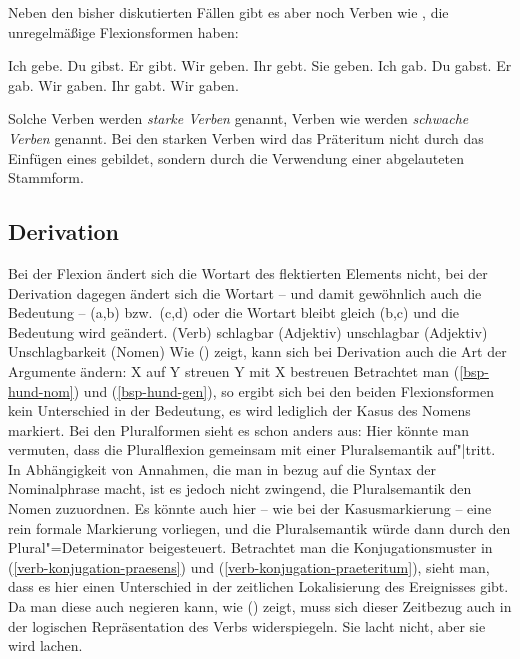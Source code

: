 Neben den bisher diskutierten Fällen gibt es aber noch Verben wie , die unregelmäßige
Flexionsformen haben:
\begin{multicols}{2}
\eal
\ex Ich gebe.   
\ex Du  gibst.  
\ex Er  gibt.   
\ex Wir geben.  
\ex Ihr gebt.   
\ex Sie geben. 
\zl
\eal
\ex Ich gab.
\ex Du  gabst.
\ex Er  gab.
\ex Wir gaben.
\ex Ihr gabt.
\ex Wir gaben. 
\zl
\end{multicols}
\noindent
Solche Verben werden \emph{starke Verben} genannt,
Verben wie  werden \emph{schwache Verben} genannt.
Bei den starken Verben wird das Präteritum nicht durch das Einfügen eines  gebildet,
sondern durch die Verwendung einer abgelauteten Stammform.


\subsection{Derivation}
\label{sec-phen-derivation}

Bei der Flexion ändert sich die Wortart des flektierten Elements nicht, 
bei der Derivation dagegen ändert sich die Wortart -- und damit
gewöhnlich auch die Bedeutung -- (a,b) bzw.\ (c,d) 
oder die Wortart bleibt gleich (b,c) und die Bedeutung wird geändert.
\eal
\ex {} (Verb)
\ex schlagbar (Adjektiv)
\ex unschlagbar (Adjektiv)
\ex Unschlagbarkeit (Nomen)
\zl
Wie () zeigt, kann sich bei Derivation auch die Art der Argumente ändern:
\eal
\ex X auf Y streuen 
\ex Y mit X bestreuen
\zl
Betrachtet man (\ref{bsp-hund-nom}) und (\ref{bsp-hund-gen}), so ergibt sich bei den beiden
Flexionsformen kein Unterschied in der Bedeutung, es wird lediglich der Kasus des Nomens
markiert. Bei den Pluralformen sieht es schon anders aus: Hier könnte man vermuten,
dass die Pluralflexion gemeinsam mit einer Pluralsemantik auf"|tritt. In Abhängigkeit von
Annahmen, die man in bezug auf die Syntax der Nominalphrase macht, ist es jedoch
nicht zwingend, die Pluralsemantik den Nomen zuzuordnen. Es könnte auch hier -- wie bei der Kasusmarkierung --
eine rein formale Markierung vorliegen, und die Pluralsemantik würde dann durch den Plural"=Determinator beigesteuert.
Betrachtet man die Konjugationsmuster in (\ref{verb-konjugation-praesens}) und (\ref{verb-konjugation-praeteritum}),
sieht man, dass es hier einen Unterschied in der zeitlichen Lokalisierung des Ereignisses gibt.
Da man diese auch negieren kann, wie () zeigt, muss sich dieser Zeitbezug auch in der
logischen Repräsentation des Verbs widerspiegeln.
\ea
Sie lacht nicht, aber sie wird lachen.
\z

